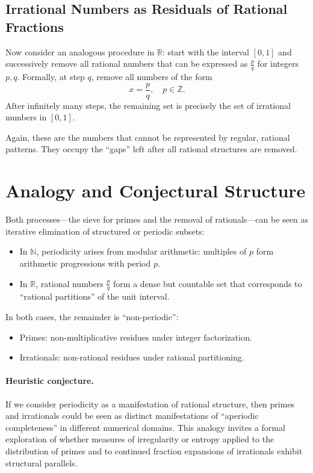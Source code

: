 \documentclass[12pt]{article}
\begin{document}
\subsection{Irrational Numbers as Residuals of Rational Fractions}

Now consider an analogous procedure in $\mathbb{R}$:  
start with the interval $[0,1]$ and successively remove all rational numbers that can be expressed as $\frac{p}{q}$ for integers $p,q$.  
Formally, at step $q$, remove all numbers of the form
\[
x = \frac{p}{q}, \quad p \in \mathbb{Z}.
\]
After infinitely many steps, the remaining set is precisely the set of irrational numbers in $[0,1]$.

Again, these are the numbers that cannot be represented by regular, rational patterns.  
They occupy the ``gaps'' left after all rational structures are removed.

\section{Analogy and Conjectural Structure}

Both processes---the sieve for primes and the removal of rationals---can be seen as iterative elimination of structured or periodic subsets:
\begin{itemize}
    \item In $\mathbb{N}$, periodicity arises from modular arithmetic: multiples of $p$ form arithmetic progressions with period $p$.
    \item In $\mathbb{R}$, rational numbers $\frac{p}{q}$ form a dense but countable set that corresponds to ``rational partitions'' of the unit interval.
\end{itemize}

In both cases, the remainder is ``non-periodic'':
\begin{itemize}
    \item Primes: non-multiplicative residues under integer factorization.
    \item Irrationals: non-rational residues under rational partitioning.
\end{itemize}

\paragraph{Heuristic conjecture.}  
If we consider periodicity as a manifestation of rational structure, then primes and irrationals could be seen as distinct manifestations of ``aperiodic completeness'' in different numerical domains.  
This analogy invites a formal exploration of whether measures of irregularity or entropy applied to the distribution of primes and to continued fraction expansions of irrationals exhibit structural parallels.
\end{document}
